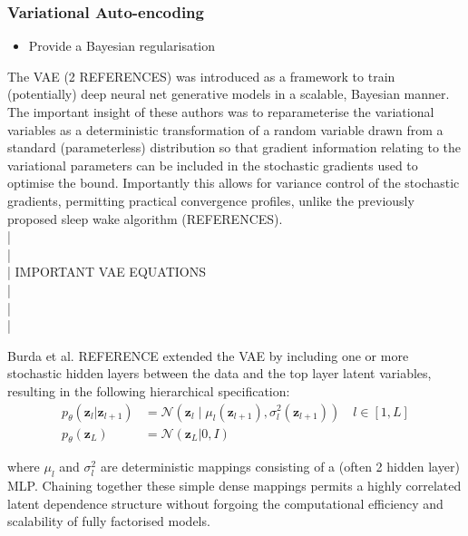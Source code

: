 \documentclass[]{article}
\newcommand{\zb}{\mathbf{z}}
\newcommand{\No}{\mathcal{N}}
\begin{document}
\subsubsection{Variational Auto-encoding}

\begin{itemize}
  \item Provide a Bayesian regularisation
\end{itemize}
The VAE (2 REFERENCES) was introduced as a framework to train (potentially) deep neural net generative models in a scalable, Bayesian manner. The important insight of these authors was to reparameterise the variational variables as a deterministic transformation of a random variable drawn from a standard (parameterless) distribution so that gradient information relating to the variational parameters can be included in the stochastic gradients used to optimise the bound. Importantly this allows for variance control of the stochastic gradients, permitting practical convergence profiles, unlike the previously proposed sleep wake algorithm (REFERENCES).
\\ |
\\ |
\\ |
IMPORTANT VAE EQUATIONS
\\ |
\\ |
\\ |

Burda et al. REFERENCE extended the VAE by including one or more stochastic hidden layers between the data and the top layer latent variables, resulting in the following hierarchical specification:
%
\begin{align}
  p_\theta(\zb_l|\zb_{l+1}) &= \No(\zb_l\mid \mu_l(\zb_{l+1}), \sigma^2_l(\zb_{l+1}))\quad l\in[1,L] \\
  p_\theta(\zb_L) &= \No(\zb_L|0, I)
\end{align}

where $\mu_l$ and $\sigma^2_l$ are deterministic mappings consisting of a (often 2 hidden layer) MLP. Chaining together these simple dense mappings permits a highly correlated latent dependence structure without forgoing the computational efficiency and scalability of fully factorised models.
\end{document}
